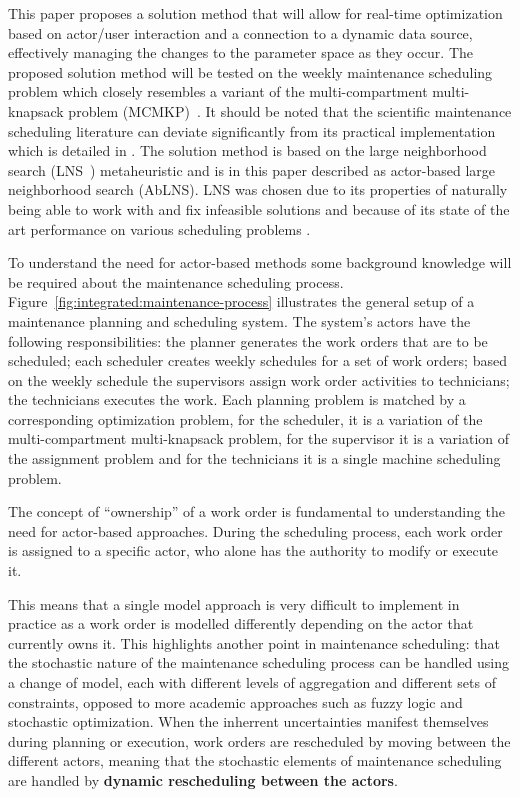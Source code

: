 This paper proposes a solution method that will allow for real-time optimization
based on actor/user interaction and a connection to a dynamic data source,
effectively managing the changes to the parameter space as they occur. The
proposed solution method will be tested on the weekly maintenance scheduling
problem \citep{palmerMaintenancePlanningScheduling2019weeklyscheduling}
which closely resembles a variant of the multi-compartment multi-knapsack
problem (MCMKP)~\citep{do2007constrained}. It should be noted
that the scientific maintenance scheduling literature can deviate
significantly from its practical implementation which is detailed in
\citep{palmerMaintenancePlanningScheduling2019}. The solution method is based
on the large neighborhood search (LNS~\citep{shaw1998using}) metaheuristic and
is in this paper described as actor-based large neighborhood search (AbLNS). LNS
was chosen due to its properties of naturally being able to work with and fix
infeasible solutions and because of its state of the art performance on various
scheduling problems \citep{gendreauHandbookMetaheuristics2019lnschapter}.

To understand the need for actor-based methods some
background knowledge will be required about the maintenance scheduling process.
Figure~\ref{fig:integrated:maintenance-process} illustrates the general setup
of a maintenance planning and scheduling system. The system's actors
have the following responsibilities: the planner generates the work orders that
are to be scheduled; each scheduler creates weekly schedules for a set of work orders; 
based on the weekly schedule the supervisors assign work order
activities to technicians; the
technicians executes the work. Each planning problem is matched 
by a corresponding optimization problem, for the scheduler, it is a variation of the
multi-compartment multi-knapsack problem, for the supervisor it is a variation of the 
assignment problem and for the technicians it is a single machine scheduling problem.

The concept of ``ownership'' of a work order is fundamental to understanding
the need for actor-based approaches. During the scheduling process, each work
order is assigned to a specific actor, who alone has the authority to modify or
execute it.

This means that a single model approach is very difficult to implement in practice
as a work order is modelled differently depending on the actor that currently
owns it. This highlights another point in maintenance scheduling: that
the stochastic nature of the maintenance scheduling process can be handled using
a change of model, each with different levels of aggregation and different sets
of constraints, opposed to more academic approaches such as fuzzy logic and
stochastic optimization. When the inherrent uncertainties manifest themselves
during planning or execution, work orders are rescheduled by moving between
the different actors, meaning that the stochastic elements of maintenance
scheduling are handled by \textbf{dynamic rescheduling between the actors}.


